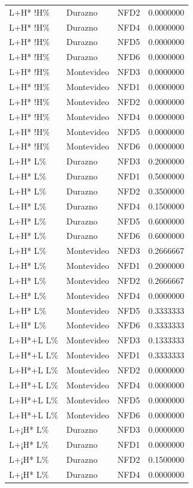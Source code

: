 \documentclass[
  man]{apa6}
\begin{document}
\begin{longtable}[]{@{}lllr@{}}
L+H* !H\% & Durazno & NFD2 & 0.0000000 \\
L+H* !H\% & Durazno & NFD4 & 0.0000000 \\
L+H* !H\% & Durazno & NFD5 & 0.0000000 \\
L+H* !H\% & Durazno & NFD6 & 0.0000000 \\
L+H* !H\% & Montevideo & NFD3 & 0.0000000 \\
L+H* !H\% & Montevideo & NFD1 & 0.0000000 \\
L+H* !H\% & Montevideo & NFD2 & 0.0000000 \\
L+H* !H\% & Montevideo & NFD4 & 0.0000000 \\
L+H* !H\% & Montevideo & NFD5 & 0.0000000 \\
L+H* !H\% & Montevideo & NFD6 & 0.0000000 \\
L+H* L\% & Durazno & NFD3 & 0.2000000 \\
L+H* L\% & Durazno & NFD1 & 0.5000000 \\
L+H* L\% & Durazno & NFD2 & 0.3500000 \\
L+H* L\% & Durazno & NFD4 & 0.1500000 \\
L+H* L\% & Durazno & NFD5 & 0.6000000 \\
L+H* L\% & Durazno & NFD6 & 0.6000000 \\
L+H* L\% & Montevideo & NFD3 & 0.2666667 \\
L+H* L\% & Montevideo & NFD1 & 0.2000000 \\
L+H* L\% & Montevideo & NFD2 & 0.2666667 \\
L+H* L\% & Montevideo & NFD4 & 0.0000000 \\
L+H* L\% & Montevideo & NFD5 & 0.3333333 \\
L+H* L\% & Montevideo & NFD6 & 0.3333333 \\
L+H*+L L\% & Montevideo & NFD3 & 0.1333333 \\
L+H*+L L\% & Montevideo & NFD1 & 0.3333333 \\
L+H*+L L\% & Montevideo & NFD2 & 0.0000000 \\
L+H*+L L\% & Montevideo & NFD4 & 0.0000000 \\
L+H*+L L\% & Montevideo & NFD5 & 0.0000000 \\
L+H*+L L\% & Montevideo & NFD6 & 0.0000000 \\
L+¡H* L\% & Durazno & NFD3 & 0.0000000 \\
L+¡H* L\% & Durazno & NFD1 & 0.0000000 \\
L+¡H* L\% & Durazno & NFD2 & 0.1500000 \\
L+¡H* L\% & Durazno & NFD4 & 0.0000000 \\

\end{longtable}
\end{document}

